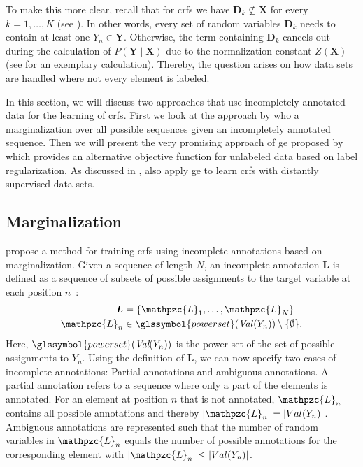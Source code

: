 To make this more clear, recall that for \glspl{crf} we have $\mathbf{D}_k\not\subseteq\mathbf{X}$ for every $k=1,\dots,K$ (see ).
In other words, every set of \glspl{random variable} $\mathbf{D}_k$ needs to contain at least one $Y_n\in\mathbf{Y}$.
Otherwise, the term containing $\mathbf{D}_k$ cancels out during the calculation of $P(\mathbf{Y}\mid\mathbf{X})$ due to the normalization constant $Z(\mathbf{X})$ (see  for an exemplary calculation).
Thereby, the question arises on how data sets are handled where not every element is labeled.

In this section, we will discuss two approaches that use incompletely annotated data for the learning of \glspl{crf}.
First we look at the approach by \citet{tsuboi2008training} who a marginalization over all possible sequences given an incompletely annotated sequence.
Then we will present the very promising approach of \acrfull{ge} proposed by \citet{mann2007simple} which provides an alternative \gls{objective function} for unlabeled data based on \gls{label regularization}.
As discussed in , \citet{lu2013web} also apply \gls{ge} to learn \glspl{crf} with distantly supervised data sets.

\subsection{Marginalization}

\citet{tsuboi2008training} propose a method for training \glspl{crf} using incomplete annotations based on marginalization.
Given a sequence of length $N$, an incomplete annotation $\bm{L}$ is defined as a sequence of subsets of possible assignments to the \gls{target variable} at each position $n$~\citep{tsuboi2008training}:
\begin{equation}
  \label{equ:incomplete-annotation}
  \begin{split}
    \bm{L}&= \left\{\mathpzc{L}_1,\dots,\mathpzc{L}_N\right\}\\
    \mathpzc{L}_n&\in\glssymbol{power set}(\mathit{Val}(Y_n))\setminus \{\emptyset\}.
  \end{split}
\end{equation}
Here, $\glssymbol{power set}(\textit{Val}(Y_n))$ is the \gls{power set} of the set of possible \glspl{assignment} to $Y_n$.
Using the definition of $\bm{L}$, we can now specify two cases of incomplete annotations: Partial annotations and ambiguous annotations.
A partial annotation refers to a sequence where only a part of the elements is annotated.
For an element at position $n$ that is not annotated, $\mathpzc{L}_n$ contains all possible annotations and thereby $|\mathpzc{L}_n|=|Val(Y_n)|$.
Ambiguous annotations are represented such that the number of \glspl{random variable} in $\mathpzc{L}_n$ equals the number of possible annotations for the corresponding element with $|\mathpzc{L}_n|\leq |Val(Y_n)|$.

